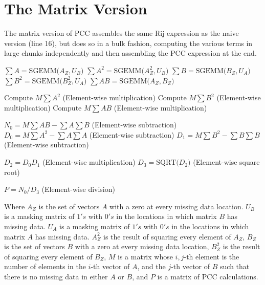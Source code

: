 \documentclass{bioinfo}
\begin{document}
\section{The Matrix Version}
The matrix version of PCC assembles the same Rij expression as the naive version (line 16), 
but does so in a bulk fashion, computing the various terms in large chunks independently
and then assembling the PCC expression at the end.
\begin{algorithmic}[1]

  \STATE $\sum A=\text{SGEMM(}A_Z,U_B\text{)}$
  \STATE $\sum A^2=\text{SGEMM(}A_Z^2,U_B\text{)}$
  \STATE $\sum B=\text{SGEMM(}B_Z,U_A\text{)}$
  \STATE $\sum B^2=\text{SGEMM(}B_Z^2,U_A\text{)}$
  \STATE $\sum AB=\text{SGEMM(}A_Z,B_Z\text{)}$
  
  \vspace{2mm}

  \STATE Compute $M\sum A^2$   (Element-wise multiplication)
  \STATE Compute $M\sum B^2$   (Element-wise multiplication)
  \STATE Compute $M\sum AB$   (Element-wise multiplication)
  
  \vspace{2mm}

  \STATE $N_0=M\sum AB - \sum A\sum B$   (Element-wise subtraction)
  \STATE $D_0=M\sum A^2 - \sum A\sum A$   (Element-wise subtraction)
  \STATE $D_1=M\sum B^2 - \sum B\sum B$   (Element-wise subtraction)

  \vspace{2mm}

  \STATE $D_2=D_0 D_1 $   (Element-wise multiplication)
  \STATE $D_3=\text{SQRT(}D_2\text{)}$   (Element-wise square root)

  \vspace{2mm}

  \STATE $P=N_0 / D_3$   (Element-wise division)
  
\end{algorithmic}

\noindent Where $A_Z$ is the set of vectors $A$ with a zero at every missing data location.
$U_B$ is a masking matrix of $1's$ with $0's$ in the locations in which matrix $B$ has missing data. 
$U_A$ is a masking matrix of $1's$ with $0's$ in the locations in which matrix $A$ has missing data.
$A_Z^2$ is the result of squaring every element of $A_Z$, 
$B_Z$ is the set of vectors $B$ with a zero at every missing data location, 
$B_Z^2$ is the result of squaring every element of $B_Z$, 
$M$ is a matrix whose $i, j$-th element is the number of 
elements in the $i$-th vector of $A$, and the $j$-th vector of $B$ 
such that there is no missing data in either $A$ or $B$, and $P$ is 
a matrix of PCC calculations.
\end{document}
